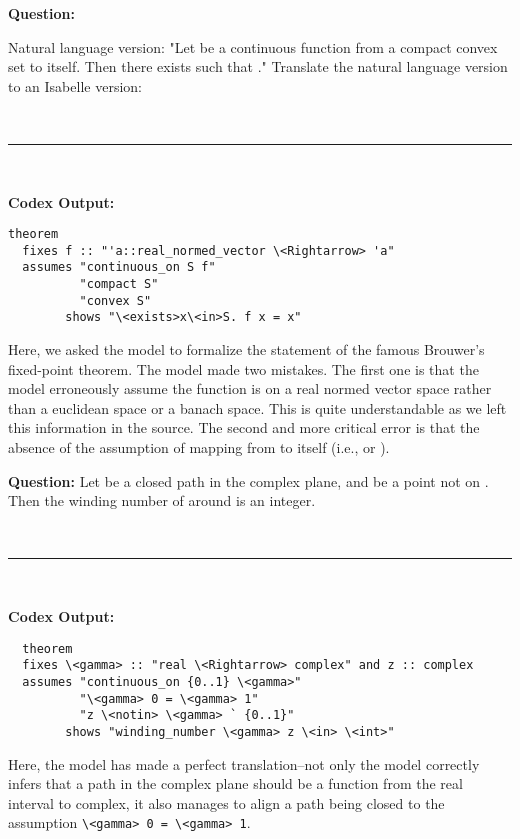 \documentclass{article}
\begin{document}
\begin{boxB}
\textbf{Question:}

Natural language version: "Let  be a continuous function from a compact convex set  to itself.
 Then there exists  such that ." Translate the natural language version to an Isabelle version:

\
\hrule
\

\textbf{Codex Output:}

\begin{lstlisting}
theorem
  fixes f :: "'a::real_normed_vector \<Rightarrow> 'a"
  assumes "continuous_on S f"
          "compact S"
          "convex S"
        shows "\<exists>x\<in>S. f x = x"
\end{lstlisting}
\end{boxB}
Here, we asked the model to formalize the statement of the famous Brouwer's fixed-point theorem. The model made two mistakes. The first one is that the model erroneously assume the function is on a real normed vector space rather than a euclidean space or a banach space. This is quite understandable as we left this information in the source. The second and more critical error is that the absence of the assumption of  mapping from  to itself (i.e.,  or ).

\begin{boxB}
\textbf{Question:}
Let  be a closed path in the complex plane, 
and  be a point not on . Then the winding 
number of  around  is an integer.

\
\hrule
\

\textbf{Codex Output:}
\begin{lstlisting}
  theorem
  fixes \<gamma> :: "real \<Rightarrow> complex" and z :: complex
  assumes "continuous_on {0..1} \<gamma>"
          "\<gamma> 0 = \<gamma> 1"
          "z \<notin> \<gamma> ` {0..1}"
        shows "winding_number \<gamma> z \<in> \<int>"
\end{lstlisting}
\end{boxB}
Here, the model has made a perfect translation--not only the model correctly infers that a path in the complex plane should be a function from the real interval  to complex, it also manages to align a path being closed to the assumption \verb|\<gamma> 0 = \<gamma> 1|.

\newpage
\end{document}
